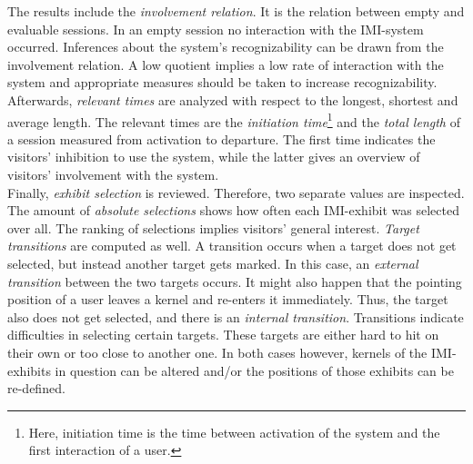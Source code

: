 The results include the \textit{involvement relation}. It is the relation between empty and evaluable sessions. In an empty session no interaction with the \ac{IMI}-system occurred. Inferences about the system's recognizability can be drawn from the involvement relation. A low quotient implies a low rate of interaction with the system and appropriate measures should be taken to increase recognizability.
\\
Afterwards, \textit{relevant times} are analyzed with respect to the longest, shortest and average length. The relevant times are the \textit{initiation time}\footnote{Here, initiation time is the time between activation of the system and the first interaction of a user.} and the \textit{total length} of a session measured from activation to departure. The first time indicates the visitors' inhibition to use the system, while the latter gives an overview of visitors' involvement with the system.
\\
Finally, \textit{exhibit selection} is reviewed. Therefore, two separate values are inspected. The amount of \textit{absolute selections} shows how often each \ac{IMI}-exhibit was selected over all. The ranking of selections implies visitors' general interest. \textit{Target transitions} are computed as well. A transition occurs when a target does not get selected, but instead another target gets marked. In this case, an \textit{external transition} between the two targets occurs. It might also happen that the pointing position of a user leaves a kernel and re-enters it immediately. Thus, the target also does not get selected, and there is an \textit{internal transition}. Transitions indicate difficulties in selecting certain targets. These targets are either hard to hit on their own or too close to another one. In both cases however, kernels of the \ac{IMI}-exhibits in question can be altered and/or the positions of those exhibits can be re-defined.

%

